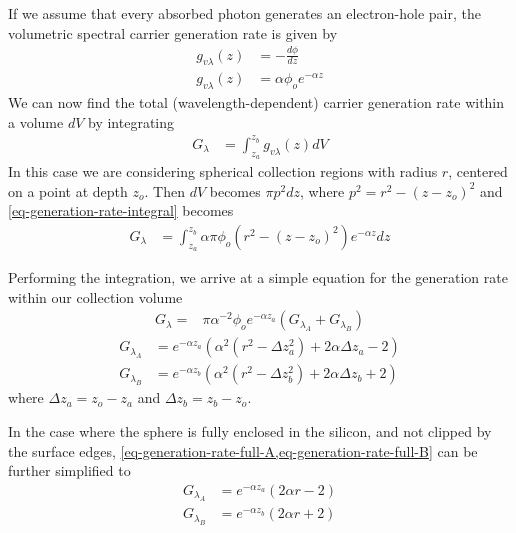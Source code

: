 \documentclass[journal,twoside]{IEEEtran}
\begin{document}
If we assume that every absorbed photon generates an electron-hole pair, the volumetric spectral carrier generation rate is
given by
\begin{align}
	g_{v\lambda}(z) &= -\frac{d\phi}{dz} \\
	g_{v\lambda}(z) &= \alpha \phi_o e^{-\alpha z}	\label{eq-generation-rate-depth}
\end{align}
We can now find the total (wavelength-dependent) carrier generation rate within a volume $dV$ by integrating
\begin{align}
	G_\lambda &= \int_{z_a}^{z_b} g_{v\lambda}(z) dV	\label{eq-generation-rate-integral-abstract}
\end{align}
In this case we are considering spherical collection regions with radius $r$, centered on a point at depth $z_o$.
Then $dV$ becomes $\pi p^2 dz$, where $p^2 = r^2 - (z-z_o)^2$ and \cref{eq-generation-rate-integral} becomes
\begin{align}
	G_\lambda &= \int_{z_a}^{z_b} \alpha \pi \phi_o \left(r^2- \left(z - z_o\right)^2\right) e^{-\alpha z} dz	\label{eq-generation-rate-integral}
\end{align}

Performing the integration, we arrive at a simple equation for the generation rate within our collection volume
\begin{align}
	G_\lambda = &\pi \alpha^{-2} \phi_o e^{-\alpha z_a} \left( G_{\lambda_A} + G_{\lambda_B} \right)	\label{eq-generation-rate-full}
\end{align}
\begin{align}
	G_{\lambda_A} &= e^{-\alpha z_a} \left( \alpha^2 (r^2-\Delta z_a^2 ) + 2\alpha\Delta z_a - 2\right)	\label{eq-generation-rate-full-A}	\\
	G_{\lambda_B} &= e^{-\alpha z_b} \left( \alpha^2 (r^2-\Delta z_b^2 ) + 2\alpha\Delta z_b + 2\right)	\label{eq-generation-rate-full-B}
\end{align}
where $\Delta z_a = z_o - z_a$ and $\Delta z_b = z_b - z_o$.

In the case where the sphere is fully enclosed in the silicon, and not clipped by the surface edges, \cref{eq-generation-rate-full-A,eq-generation-rate-full-B}
can be further simplified to
\begin{align}
	G_{\lambda_A} &= e^{-\alpha z_a} \left( 2\alpha r - 2\right)	\label{eq-generation-rate-simplified-A}	\\
	G_{\lambda_B} &= e^{-\alpha z_b} \left( 2\alpha r + 2\right)	\label{eq-generation-rate-simplified-B}
\end{align}
\end{document}
